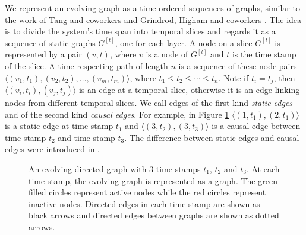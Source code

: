 \documentclass[12pt]{article}
\theoremstyle{definition}
\begin{document}
We represent an evolving graph as a time-ordered sequences of graphs, similar to the work of Tang and coworkers \cite{tang10, tang102, tang09, nicosia13} and Grindrod, Higham and coworkers \cite{grindrod11, grindrod13}. The idea is to divide the system's time span into temporal slices and regards it as a sequence of static graphs $G^{[t]}$, one for each layer. A node on a slice $G^{[t]}$ is represented by a pair $(v, t)$, where $v$ is a node of
$G^{[t]}$ and $t$ is the time stamp of the slice. A time-respecting path of length $n$ is a sequence of these node pairs $\langle (v_1, t_1), (v_2, t_2), \ldots ,(v_m, t_m)\rangle$, where $t_1 \le t_2 \le \cdots \le t_n$. Note if $t_i = t_j$, then $\langle (v_i, t_i), (v_j, t_j) \rangle$ is an edge at a temporal slice,  otherwise it is an edge linking nodes from different temporal slices.
We call edges of the first kind \emph{static edges} and of the second kind
\emph{causal edges}.
For example, in Figure \ref{fig:eg_shortest_path}
$\langle (1, t_1), (2, t_1) \rangle$ is a static edge at time stamp $t_1$ and $\langle (3, t_2), (3, t_3) \rangle$ is a causal edge between time stamp $t_2$ and time stamp $t_3$.
The difference between static edges and causal edges were introduced in \cite{chen16}.

\begin{figure}[h]
 \begin{center}
\end{center}
\caption{An evolving directed graph with 3 time stamps $t_1$, $t_2$ and $t_3$.
At each time stamp, the evolving graph is represented as a graph.
The green filled circles represent active nodes while the red circles represent
inactive nodes. Directed edges in each time stamp are shown as black arrows and directed edges between graphs are shown as dotted arrows.}
\label{fig:eg_shortest_path}
\end{figure}
\end{document}
